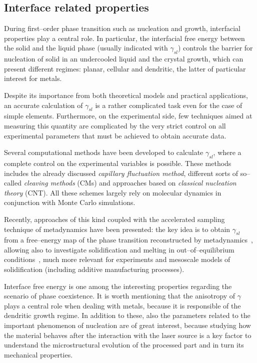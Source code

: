 \subsection{Interface related properties}
During first--order phase transition such as nucleation and growth, interfacial properties play a central role. In particular, the interfacial free energy between the solid and the liquid phase (usually indicated with $\gamma_{sl}$) controls the barrier for nucleation of solid in an undercooled liquid and the crystal growth, which can present different regimes: planar, cellular and dendritic, the latter of particular interest for metals.

Despite its importance from both theoretical models and practical applications, an accurate calculation of $\gamma_{sl}$ is a rather complicated task even for the case of simple elements. Furthermore, on the experimental side, few techniques aimed at measuring this quantity are complicated by the very strict control on all experimental parameters that must be achieved to obtain accurate data.%

Several computational methods have been developed to calculate $\gamma_{sl}$, where a complete control on the experimental variables is possible. These methods includes the already discussed \emph{capillary fluctuation method}, different sorts of so--called \emph{cleaving methods} (CMs) and approaches based on \emph{classical nucleation theory} (CNT). All these schemes largely rely on molecular dynamics in conjunction with Monte Carlo simulations.

Recently, approaches of this kind coupled with the accelerated sampling technique of metadynamics have been presented: the key idea is to obtain $\gamma_{sl}$ from a free--energy map of the phase transition reconstructed by metadynamics~\cite{Angioletti-Uberti2010}, allowing also to investigate solidification and melting in out--of--equilibrium conditions~\cite{Cheng2015}, much more relevant for experiments and mesoscale models of solidification (including additive manufacturing processes).

Interface free energy is one among the interesting properties regarding the scenario of phase coexistence. It is worth mentioning that the anisotropy of $\gamma$ plays a central role when dealing with metals, because it is responsible of the dendritic growth regime. In addition to these, also the parameters related to the important phenomenon of nucleation are of great interest, because studying how the material behaves after the interaction with the laser source is a key factor to understand the microstructural evolution of the processed part and in turn its mechanical properties.


